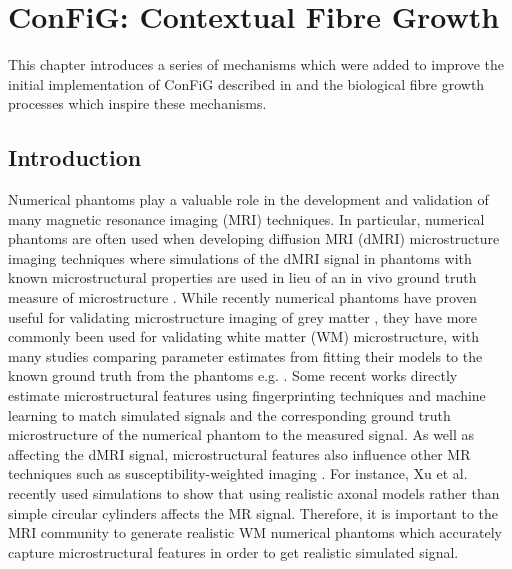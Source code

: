 \chapter{ConFiG: Contextual Fibre Growth}
\label{chap:config}

\chaptertoc{}

\begin{chapterabstract}
  This chapter introduces a series of mechanisms which were added to improve the initial implementation of ConFiG described in  and the biological fibre growth processes which inspire these mechanisms.
\end{chapterabstract}

\section{Introduction}
\label{sec:config_introduction}
Numerical phantoms play a valuable role in the development and validation of many magnetic resonance imaging (MRI) techniques.
In particular, numerical phantoms are often used when developing diffusion MRI (dMRI) microstructure imaging techniques where simulations of the dMRI signal in phantoms with known microstructural properties are used in lieu of an in vivo ground truth measure of microstructure \cite{Alexander2017}.
While recently numerical phantoms have proven useful for validating microstructure imaging of grey matter \cite{Palombo2020}, they have more commonly been used for validating white matter (WM) microstructure, with many studies comparing parameter estimates from fitting their models to the known ground truth from the phantoms e.g. \cite{Li2019,Jelescu2017,Scherrer2016,Tariq2016,Daducci2015,Nilsson2017,Xu2014,Zhang2012,Nilsson2010}.
Some recent works directly estimate microstructural features using fingerprinting techniques and machine learning to match simulated signals and the corresponding ground truth microstructure of the numerical phantom to the measured signal\cite{Hill2019,Palombo2018a,Rensonnet2018,Nedjati-Gilani2017}.
As well as affecting the dMRI signal, microstructural features also influence other MR techniques such as susceptibility-weighted imaging \cite{Li2012,Lee2010}.
For instance, Xu et al. \cite{Xu2018} recently used simulations to show that using realistic axonal models rather than simple circular cylinders affects the MR signal.
Therefore, it is important to the MRI community to generate realistic WM numerical phantoms which accurately capture microstructural features in order to get realistic simulated signal.

